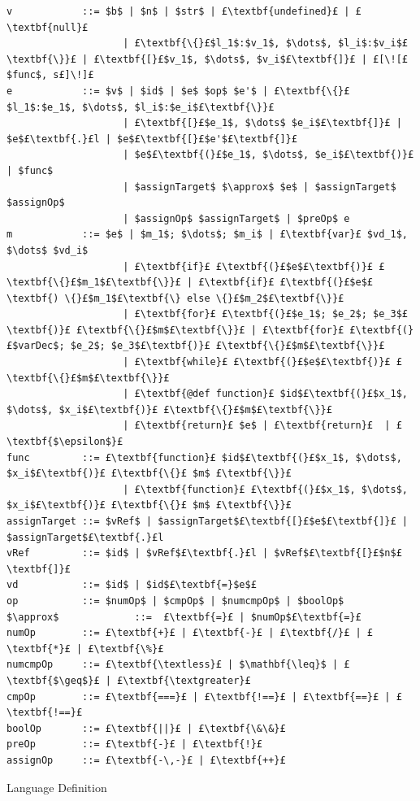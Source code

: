 \documentclass[12pt,a4paper,twoside,openright]{report}
\theoremstyle{definition}
\theoremstyle{dotless}
\begin{document}
\begin{listing}
  \begin{lstlisting}[mathescape, escapechar=£]
v            ::= $b$ | $n$ | $str$ | £\textbf{undefined}£ | £\textbf{null}£
                    | £\textbf{\{}£$l_1$:$v_1$, $\dots$, $l_i$:$v_i$£\textbf{\}}£ | £\textbf{[}£$v_1$, $\dots$, $v_i$£\textbf{]}£ | £[\![£$func$, s£]\!]£
e            ::= $v$ | $id$ | $e$ $op$ $e'$ | £\textbf{\{}£$l_1$:$e_1$, $\dots$, $l_i$:$e_i$£\textbf{\}}£ 
                    | £\textbf{[}£$e_1$, $\dots$ $e_i$£\textbf{]}£ | $e$£\textbf{.}£l | $e$£\textbf{[}£$e'$£\textbf{]}£ 
                    | $e$£\textbf{(}£$e_1$, $\dots$, $e_i$£\textbf{)}£ | $func$
                    | $assignTarget$ $\approx$ $e$ | $assignTarget$ $assignOp$ 
                    | $assignOp$ $assignTarget$ | $preOp$ e
m            ::= $e$ | $m_1$; $\dots$; $m_i$ | £\textbf{var}£ $vd_1$, $\dots$ $vd_i$ 
                    | £\textbf{if}£ £\textbf{(}£$e$£\textbf{)}£ £\textbf{\{}£$m_1$£\textbf{\}}£ | £\textbf{if}£ £\textbf{(}£$e$£\textbf{) \{}£$m_1$£\textbf{\} else \{}£$m_2$£\textbf{\}}£ 
                    | £\textbf{for}£ £\textbf{(}£$e_1$; $e_2$; $e_3$£\textbf{)}£ £\textbf{\{}£$m$£\textbf{\}}£ | £\textbf{for}£ £\textbf{(}£$varDec$; $e_2$; $e_3$£\textbf{)}£ £\textbf{\{}£$m$£\textbf{\}}£ 
                    | £\textbf{while}£ £\textbf{(}£$e$£\textbf{)}£ £\textbf{\{}£$m$£\textbf{\}}£ 
                    | £\textbf{@def function}£ $id$£\textbf{(}£$x_1$, $\dots$, $x_i$£\textbf{)}£ £\textbf{\{}£$m$£\textbf{\}}£
                    | £\textbf{return}£ $e$ | £\textbf{return}£  | £\textbf{$\epsilon$}£
func         ::= £\textbf{function}£ $id$£\textbf{(}£$x_1$, $\dots$, $x_i$£\textbf{)}£ £\textbf{\{}£ $m$ £\textbf{\}}£ 
                    | £\textbf{function}£ £\textbf{(}£$x_1$, $\dots$, $x_i$£\textbf{)}£ £\textbf{\{}£ $m$ £\textbf{\}}£
assignTarget ::= $vRef$ | $assignTarget$£\textbf{[}£$e$£\textbf{]}£ | $assignTarget$£\textbf{.}£l
vRef         ::= $id$ | $vRef$£\textbf{.}£l | $vRef$£\textbf{[}£$n$£\textbf{]}£
vd           ::= $id$ | $id$£\textbf{=}$e$£
op           ::= $numOp$ | $cmpOp$ | $numcmpOp$ | $boolOp$
$\approx$             ::=  £\textbf{=}£ | $numOp$£\textbf{=}£
numOp        ::= £\textbf{+}£ | £\textbf{-}£ | £\textbf{/}£ | £\textbf{*}£ | £\textbf{\%}£
numcmpOp     ::= £\textbf{\textless}£ | $\mathbf{\leq}$ | £\textbf{$\geq$}£ | £\textbf{\textgreater}£
cmpOp        ::= £\textbf{===}£ | £\textbf{!==}£ | £\textbf{==}£ | £\textbf{!==}£
boolOp       ::= £\textbf{||}£ | £\textbf{\&\&}£
preOp        ::= £\textbf{-}£ | £\textbf{!}£
assignOp     ::= £\textbf{-\,-}£ | £\textbf{++}£
  \end{lstlisting}
  \caption{Language Definition}
  \label{lst:langdef}
\end{listing}
\end{document}
